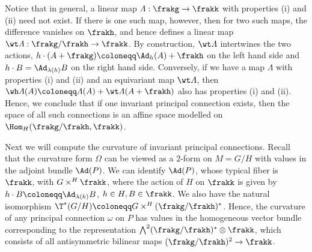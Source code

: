 \begin{rem}
    Notice that in general, a linear map $\varLambda:\frakg\to \frakk$ with properties (i) and (ii) need not exist. If there is one such map, however, then for two such maps, the difference vanishes on $\frakh$, and hence defines a linear map $\wt\varLambda:\frakg\slash\frakh\to \frakk$. By construction, $\wt\varLambda$ intertwines the two actions, $h\cdot (A+\frakg)\coloneqq \Ad_h(A)+\frakh$ on the left hand side and $h\cdot B=\Ad_{\lambda(h)}B$ on the right hand side. Conversely, if we have a map $\varLambda$ with properties (i) and (ii) and an equivariant map $\wt\varLambda$, then $\wh\varLambda(A)\coloneqq \varLambda(A)+\wt\varLambda(A+\frakh)$ also has properties (i) and (ii). Hence, we conclude that if one invariant principal connection exists, then the space of all such connections is an affine space modelled on $\Hom_H(\frakg\slash\frakh,\frakk)$.
\end{rem}

Next we will compute the curvature of invariant principal connections. Recall that the curvature form $\Omega$ can be viewed as a $2$-form on $M=G\slash H$ with values in the adjoint bundle $\Ad(P)$.  We can identify $\Ad(P)$, whose typical fiber is $\frakk$, with $G\times^H \frakk$, where the action of $H$ on $\frakk$ is given by $h\cdot B\coloneqq \Ad_{\lambda(h)}B$, $h\in H, B\in\frakk$. We also have the natural isomorphism $\T^\ast(G\slash H)\coloneqq G\times^H (\frakg\slash\frakh)^\ast$. Hence, the curvature of any principal connection $\omega$ on $P$ has values in the homogeneous vector bundle corresponding to the representation $\bigwedge\nolimits^2(\frakg\slash\frakh)^\ast\otimes\frakk$, which consists of all antisymmetric bilinear maps $(\frakg\slash\frakh)^2\to\frakk$. 

